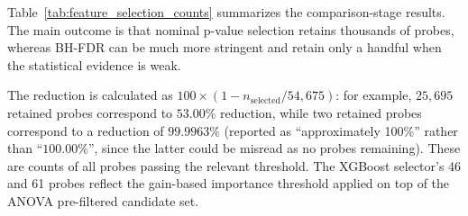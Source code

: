 Table~\ref{tab:feature_selection_counts} summarizes the comparison-stage results. The main outcome is that nominal p-value selection retains thousands of probes, whereas BH-FDR can be much more stringent and retain only a handful when the statistical evidence is weak.

\begin{table}[H]
\centering
\caption{Feature-selection summary from the comparison runs. Category reflects the taxonomy adopted in Chapter~3 (SVM-RFE is the sole wrapper method; RF, XGBoost, and LASSO are embedded methods); Method Key is the internal pipeline identifier and does not itself imply a category.}
\label{tab:feature_selection_counts}
\end{table}

The reduction is calculated as $100 \times (1 - n_{\text{selected}}/54{,}675)$: for example, $25{,}695$ retained probes correspond to $53.00\%$ reduction, while two retained probes correspond to a reduction of $99.9963\%$ (reported as ``approximately 100\%'' rather than ``$100.00\%$'', since the latter could be misread as no probes remaining). These are counts of all probes passing the relevant threshold. The XGBoost selector's 46 and 61 probes reflect the gain-based importance threshold applied on top of the ANOVA pre-filtered candidate set.

